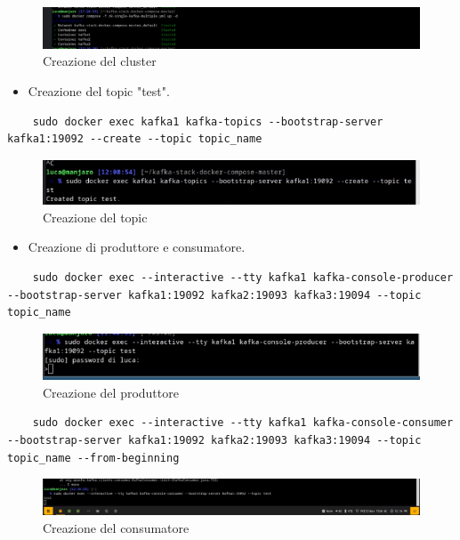 \documentclass{article}
\begin{document}
\begin{figure}[H]
    \centering
    \includegraphics[scale=0.5]{images/cluster.png}
    \caption{Creazione del cluster}
    \label{fig:my_label}
\end{figure}
\begin{itemize}
    \item Creazione del topic "test".
\end{itemize}
\begin{lstlisting}
    sudo docker exec kafka1 kafka-topics --bootstrap-server kafka1:19092 --create --topic topic_name
\end{lstlisting}
\begin{figure}[H]
    \centering
    \includegraphics[scale=0.5]{images/create_topic.png}
    \caption{Creazione del topic}
    \label{fig:my_label}
\end{figure}
\begin{itemize}
    \item Creazione di produttore e consumatore.
\end{itemize}
\begin{lstlisting}
    sudo docker exec --interactive --tty kafka1 kafka-console-producer --bootstrap-server kafka1:19092 kafka2:19093 kafka3:19094 --topic topic_name 
\end{lstlisting}
\begin{figure}[H]
    \centering
    \includegraphics[scale=0.5]{images/produttore.png}
    \caption{Creazione del produttore}
    \label{fig:my_label}
\end{figure}
\begin{lstlisting}
    sudo docker exec --interactive --tty kafka1 kafka-console-consumer --bootstrap-server kafka1:19092 kafka2:19093 kafka3:19094 --topic topic_name --from-beginning
\end{lstlisting}
\begin{figure}[H]
    \centering
    \includegraphics[scale=0.5]{images/consumatore.png}
    \caption{Creazione del consumatore}
    \label{fig:my_label}
\end{figure}
\end{document}
